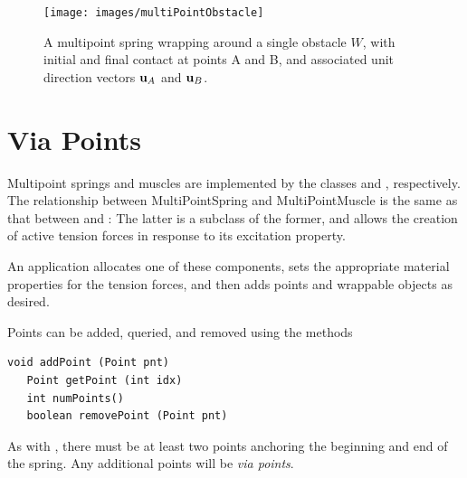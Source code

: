 \begin{figure}[ht]
\begin{center}
 \texttt{[image: images/multiPointObstacle]}
\end{center}
\caption{A multipoint spring wrapping around a single obstacle $W$,
with initial and final contact at points A and B, 
and associated unit direction vectors ${\bf u}_A$ and ${\bf u}_B$.}
\label{multiPointObstacle:fig}
\end{figure}

\section{Via Points}
\label{ViaPoints:sec}

Multipoint springs and muscles are implemented by the classes
 and
, respectively.
The relationship between {MultiPointSpring} and 
{MultiPointMuscle} is the same as that between
 and :
The latter is a subclass of the former, and allows
the creation of active tension forces in response to
its {\sf excitation} property.

An application allocates one of these components, sets the appropriate
material properties for the tension forces, and then adds points and
wrappable objects as desired.

Points can be added, queried, and removed using the methods
%
\begin{lstlisting}[]
   void addPoint (Point pnt)
   Point getPoint (int idx)
   int numPoints()
   boolean removePoint (Point pnt)
\end{lstlisting}
%
As with , there must
be at least two points anchoring the beginning and end of the
spring. Any additional points will be {\it via points}.

